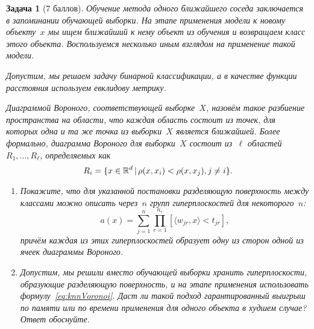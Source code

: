 \documentclass[12pt,fleqn]{article}
\newtheorem{esProblem}{Задача}
\begin{document}
\begin{esProblem}[7 баллов]
    Обучение метода одного ближайшего соседа заключается в запоминании обучающей выборки.
    На этапе применения модели к новому объекту~$x$ мы ищем ближайший к нему объект из обучения
    и возвращаем класс этого объекта.
    Воспользуемся несколько иным взглядом на применение такой модели.

    Допустим, мы решаем задачу бинарной классификации, а в качестве функции расстояния используем
    евклидову метрику.

    Диаграммой Вороного, соответствующей выборке~$X$, назовём такое разбиение пространства
    на области, что каждая область состоит из точек, для которых одна и та же точка из выборки~$X$ является ближайшей.
    Более формально, диаграмма Вороного для выборки~$X$ состоит из~$\ell$ областей~$R_1, \dots, R_\ell$,
    определяемых как
    \[
        R_i = \{x \in \mathbb{R}^d \mspace{3mu}{|}\mspace{3mu} \rho(x, x_i) < \rho(x, x_j), j \neq i\}.
    \]

    \begin{enumerate}
        \item Покажите, что для указанной постановки разделяющую поверхность между классами
            можно описать через~$n$ групп гиперплоскостей для некоторого~$n$:
            \begin{equation}
            \label{eq:knnVoronoi}
                a(x)
                =
                \sum_{j = 1}^{n}
                \prod_{r = 1}^{n_r}
                    [\langle w_{jr}, x \rangle < t_{jr}],
            \end{equation}
            причём каждая из этих гиперплоскостей образует одну из сторон
            одной из ячеек диаграммы Вороного.
        \item Допустим, мы решили вместо обучающей выборки хранить гиперплоскости, образующие разделяющую поверхность,
            и на этапе применения использовать формулу~\eqref{eq:knnVoronoi}.
            Даст ли такой подход гарантированный выигрыш по памяти или по времени применения для одного объекта
            в худшем случае?
            Ответ обоснуйте.
    \end{enumerate}
\end{esProblem}
\end{document}
